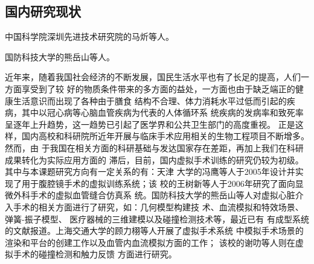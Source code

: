 %
%

\subsection{国内研究现状}
\label{sec1-3-2}

中国科学院深圳先进技术研究院的马炘等人\cite{Ma2010SIAT}。

国防科技大学的熊岳山等人\cite{Tan2012NUDT}。

近年来，随着我国社会经济的不断发展，国民生活水平也有了长足的提高，人们一方面享受到了较
好的物质条件带来的多方面的益处，一方面也由于缺乏端正的健康生活意识而出现了各种由于膳食
结构不合理、体力消耗水平过低而引起的疾病，其中以冠心病等心脑血管疾病为代表的人体循环系
统疾病的发病率和致死率呈逐年上升趋势，这一趋势已引起了医学界和公共卫生部门的高度重视。
正是这样，国内高校和科研院所近年开展与临床手术应用相关的生物工程项目不断增多。然而，由
于我国在相关方面的科研基础与发达国家存在差距，再加上我们在科研成果转化为实际应用方面的
滞后，目前，国内虚拟手术训练的研究仍较为初级。其中与本课题研究方向有一定关系的有：天津
大学的冯鹰\cite{li2005master}等人于2005年设计并实现了用于腹腔镜手术的虚拟训练系统；该
校的王树新等人\cite{zeng2006master}于2006年研究了面向显微外科手术的虚拟血管缝合仿真系
统。国防科技大学的熊岳山等人对虚拟心脏介入手术的相关方面进行了研究，如：几何模型构建技
术\cite{han2005master}、血流模拟和特效场景\cite{ren2005master}、弹簧-振子模型\cite{wang2006master}、
医疗器械的三维建模\cite{zhu2007master}以及碰撞检测技术\cite{kang2007master}等，最近已有
有成型系统的文献报道\cite{tan2012coronary}。上海交通大学的顾力栩等人开展了虚拟手术系统
中模拟手术场景的渲染和平台的创建工作\cite{zheng2008master}以及血管内血流模拟方面的工作\cite{huang2011virtual}；
该校的谢叻等人则在虚拟手术的碰撞检测\cite{wu2010virtual}和触力反馈\cite{wu2011virtual}
方面进行研究。


